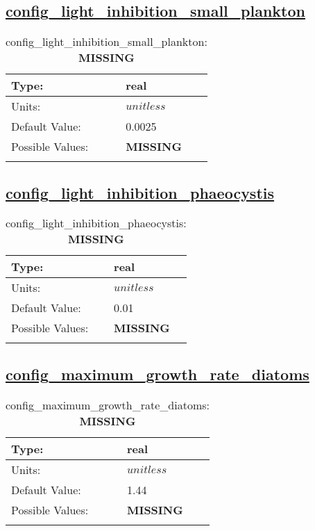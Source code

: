 \subsection[config\_light\_inhibition\_small\_plankton]{\hyperref[sec:nm_tab_biogeochemistry]{config\_light\_inhibition\_small\_plankton}}
\label{subsec:nm_sec_config_light_inhibition_small_plankton}
\begin{center}
\begin{longtable}{| p{2.0in} || p{4.0in} |}
    \hline
    Type: & real \\
    \hline
    Units: & $unitless$ \\
    \hline
    Default Value: & 0.0025 \\
    \hline
    Possible Values: & {\bf \color{red} MISSING} \\
    \hline
    \caption{config\_light\_inhibition\_small\_plankton: {\bf \color{red} MISSING}}
\end{longtable}
\end{center}
\subsection[config\_light\_inhibition\_phaeocystis]{\hyperref[sec:nm_tab_biogeochemistry]{config\_light\_inhibition\_phaeocystis}}
\label{subsec:nm_sec_config_light_inhibition_phaeocystis}
\begin{center}
\begin{longtable}{| p{2.0in} || p{4.0in} |}
    \hline
    Type: & real \\
    \hline
    Units: & $unitless$ \\
    \hline
    Default Value: & 0.01 \\
    \hline
    Possible Values: & {\bf \color{red} MISSING} \\
    \hline
    \caption{config\_light\_inhibition\_phaeocystis: {\bf \color{red} MISSING}}
\end{longtable}
\end{center}
\subsection[config\_maximum\_growth\_rate\_diatoms]{\hyperref[sec:nm_tab_biogeochemistry]{config\_maximum\_growth\_rate\_diatoms}}
\label{subsec:nm_sec_config_maximum_growth_rate_diatoms}
\begin{center}
\begin{longtable}{| p{2.0in} || p{4.0in} |}
    \hline
    Type: & real \\
    \hline
    Units: & $unitless$ \\
    \hline
    Default Value: & 1.44 \\
    \hline
    Possible Values: & {\bf \color{red} MISSING} \\
    \hline
    \caption{config\_maximum\_growth\_rate\_diatoms: {\bf \color{red} MISSING}}
\end{longtable}
\end{center}
